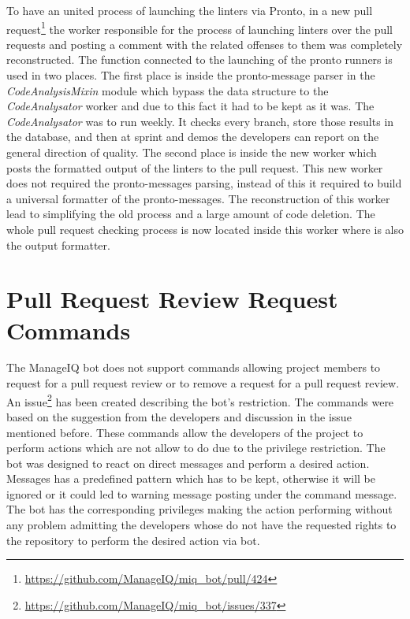To have an united process of launching the linters via Pronto, in a new pull request\footnote{\url{https://github.com/ManageIQ/miq_bot/pull/424}} the worker responsible for the process of launching linters over the pull requests and posting a comment with the related offenses to them was completely reconstructed. The function connected to the launching of the pronto runners is used in two places. The first place is inside the pronto-message parser in the \textit{CodeAnalysisMixin} module which bypass the data structure to the \textit{CodeAnalysator} worker and due to this fact it had to be kept as it was. The \textit{CodeAnalysator} was to run weekly. It checks every branch, store those results in the database, and then at sprint and demos the developers can report on the general direction of quality. The second place is inside the new worker which posts the formatted output of the linters to the pull request. This new worker does not required the pronto-messages parsing, instead of this it required to build a universal formatter of the pronto-messages.  The reconstruction of this worker lead to simplifying the old process and a large amount of code deletion. The whole pull request checking process is now located inside this worker where is also the output formatter.

\section{Pull Request Review Request Commands}

The ManageIQ bot does not support commands allowing project members to request for a pull request review or to remove a request for a pull request review. An issue\footnote{\url{https://github.com/ManageIQ/miq_bot/issues/337}} has been created describing the bot's restriction. The commands were based on the suggestion from the developers and discussion in the issue mentioned before. These commands allow the developers of the project to perform actions which are not allow to do due to the privilege restriction. The bot was designed to react on direct messages and perform a desired action. Messages has a predefined pattern which has to be kept, otherwise it will be ignored or it could led to warning message posting under the command message. The bot has the corresponding privileges making the action performing without any problem admitting the developers whose do not have the requested rights to the repository to perform the desired action via bot.

